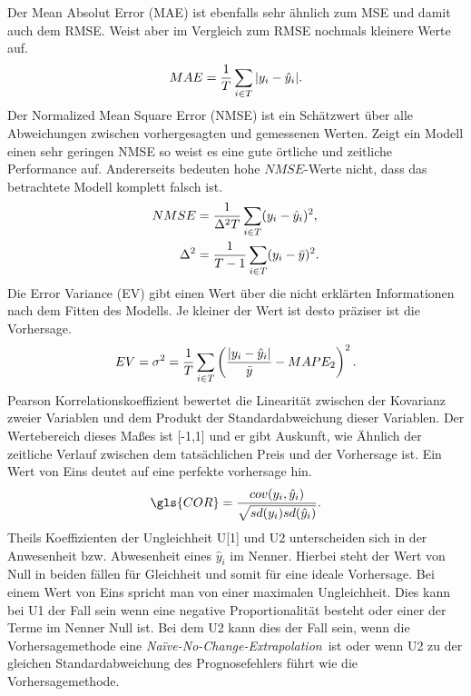 %
Der Mean Absolut Error (\gls{MAE}) ist ebenfalls sehr ähnlich zum MSE und damit auch dem RMSE. Weist aber im Vergleich zum RMSE nochmals kleinere Werte auf.
\begin{equation}
MAE= \frac{1}{T} \sum\limits_{i \in T} \abs{y_i-\hat{y}_i}.
\label{gl:MAE}
\end{equation}
%
%
Der Normalized Mean Square Error (\gls{NMSE}) ist ein Schätzwert über alle Abweichungen zwischen vorhergesagten und gemessenen Werten. Zeigt ein Modell einen sehr geringen NMSE so weist es eine gute örtliche und zeitliche Performance auf. Andererseits bedeuten hohe $NMSE$-Werte nicht, dass das betrachtete Modell komplett falsch ist.
\begin{gather}
\begin{aligned}
NMSE &= \frac{1}{\Delta^2 T} \sum\limits_{i \in T} (y_i-\hat{y}_i)^2,\\ 
\Delta^2 &= \frac{1}{T-1} \sum\limits_{i \in T} (y_i-\bar{y})^2.\\
\end{aligned}
\label{gl:NMSE}
\end{gather}
%
%
Die Error Variance (\gls{EV}) gibt einen Wert über die nicht erklärten Informationen nach dem Fitten des Modells. Je kleiner der Wert ist desto präziser ist die Vorhersage.\,
\begin{equation}
EV= \sigma^2 = \frac{1}{T} \sum\limits_{i \in T} \left ( \frac{\abs{y_i-\hat{y}_i}}{\bar{y}} - MAPE_2  \right ) ^2.
\label{gl:EV}
\end{equation}
%
Pearson Korrelationskoeffizient bewertet die Linearität zwischen der Kovarianz zweier Variablen und dem Produkt der Standardabweichung dieser Variablen. Der Wertebereich dieses Maßes ist [-1,1] und er gibt Auskunft, wie Ähnlich der zeitliche Verlauf zwischen dem tatsächlichen Preis und der Vorhersage ist. Ein Wert von Eins deutet auf eine perfekte vorhersage hin.\, 
\begin{equation}
\gls{COR} = \frac{cov(y_i,\hat{y}_i)}{\sqrt{sd(y_i)sd(\hat{y}_i)}} .
\label{gl:cor}
\end{equation}
%
%
Theils Koeffizienten der Ungleichheit \gls{U}[1] und U2 unterscheiden sich in der Anwesenheit bzw. Abwesenheit eines $\hat{y}_i$ im Nenner. Hierbei steht der Wert von Null in beiden fällen für Gleichheit und somit für eine ideale Vorhersage. Bei einem Wert von Eins spricht man von einer maximalen Ungleichheit. Dies kann bei U1 der Fall sein wenn eine negative Proportionalität besteht oder einer der Terme im Nenner Null ist. Bei dem U2 kann dies der Fall sein, wenn die Vorhersagemethode eine \textit{Na\"{i}ve-No-Change-Extrapolation}\, ist oder wenn U2 zu der gleichen Standardabweichung des Prognosefehlers führt wie die Vorhersagemethode.\,
